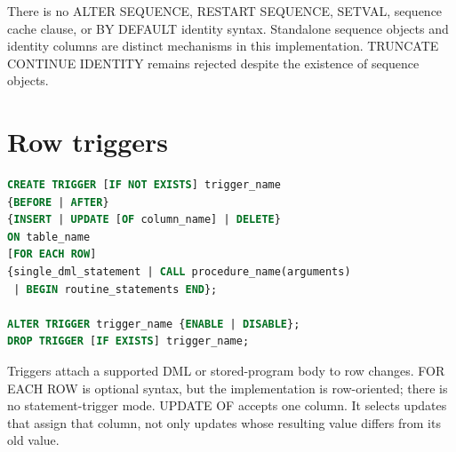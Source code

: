 
There is no ALTER SEQUENCE, RESTART SEQUENCE, SETVAL, sequence cache clause, or BY DEFAULT identity syntax. Standalone sequence objects and identity columns are distinct mechanisms in this implementation. TRUNCATE CONTINUE IDENTITY remains rejected despite the existence of sequence objects.


\section{Row triggers}
\label{sql:triggers}

\begin{lstlisting}[language=SQL]
CREATE TRIGGER [IF NOT EXISTS] trigger_name
{BEFORE | AFTER}
{INSERT | UPDATE [OF column_name] | DELETE}
ON table_name
[FOR EACH ROW]
{single_dml_statement | CALL procedure_name(arguments)
 | BEGIN routine_statements END};

ALTER TRIGGER trigger_name {ENABLE | DISABLE};
DROP TRIGGER [IF EXISTS] trigger_name;
\end{lstlisting}

Triggers attach a supported DML or stored-program body to row changes. FOR EACH ROW is optional syntax, but the implementation is row-oriented; there is no statement-trigger mode. UPDATE OF accepts one column. It selects updates that assign that column, not only updates whose resulting value differs from its old value.

